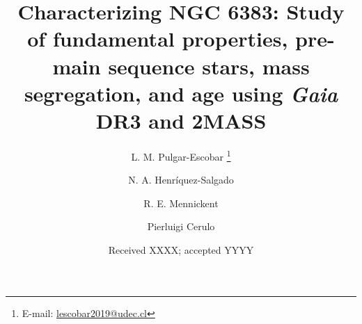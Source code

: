\documentclass{aa}
\begin{document}
   \title{Characterizing NGC 6383: Study of fundamental properties, pre-main sequence stars, mass segregation, and age using \textit{Gaia} DR3 and 2MASS}

   \author{L. M. Pulgar-Escobar
          \thanks{E-mail: \href{mailto:lescobar2019@udec.cl}{lescobar2019@udec.cl}}
          \and
        N. A. Henríquez-Salgado
        \and 
        R. E. Mennickent
        \and
        Pierluigi Cerulo
          }


   \date{Received XXXX\@; accepted YYYY}
\end{document}
